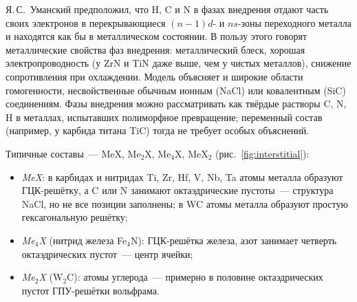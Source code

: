 Я.\,С.~Уманский предположил, что H, C и N в фазах внедрения отдают часть
своих электронов в перекрывающиеся $(n-1)d$- и $ns$-зоны переходного
металла и находятся как бы в металлическом состоянии. В пользу этого
говорят металлические свойства фаз внедрения: металлический блеск,
хорошая электропроводность (у ZrN и TiN даже выше, чем у чистых
металлов), снижение сопротивления при охлаждении. Модель объясняет и
широкие области гомогенности, несвойственные обычным ионным (NaCl) или
ковалентным (SiC) соединениям. Фазы внедрения можно рассматривать как
твёрдые растворы C, N, H в металлах, испытавших полиморфное
превращение; переменный состав (например, у карбида титана TiC) тогда
не требует особых объяснений.

Типичные составы~— MeX, Me$_2$X, Me$_4$X, MeX$_2$ (рис.~\ref{fig:interstitial}):
\begin{itemize}
\item \emph{MeX}: в карбидах и нитридах Ti, Zr, Hf, V, Nb, Ta атомы
металла образуют ГЦК-решётку, а C или N занимают октаэдрические пустоты~—
структура NaCl, но не все позиции заполнены; в WC атомы металла образуют
простую гексагональную решётку;
\item \emph{Me$_4$X} (нитрид железа Fe$_4$N): ГЦК-решётка железа, азот
занимает четверть октаэдрических пустот~— центр ячейки;
\item \emph{Me$_2$X} (W$_2$C): атомы углерода~— примерно в половине
октаэдрических пустот ГПУ-решётки вольфрама.
\end{itemize}

